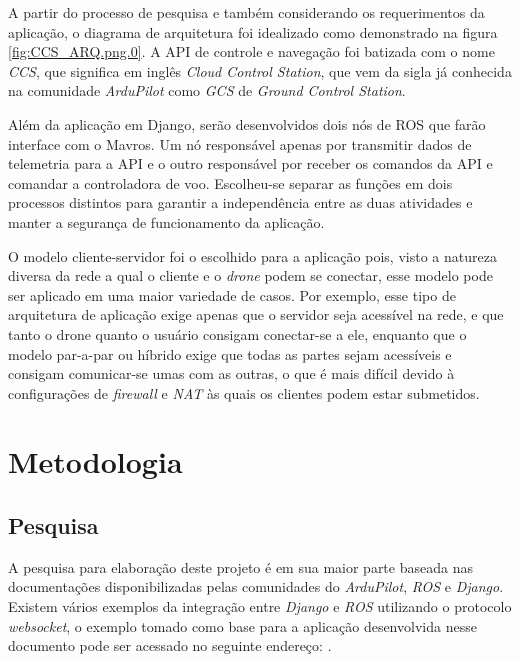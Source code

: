 \documentclass[12pt,a4paper,oneside]{book}
\begin{document}
A partir do processo de pesquisa e também considerando os requerimentos da aplicação, o diagrama de arquitetura foi idealizado como demonstrado na figura \ref{fig:CCS_ARQ.png.0}. A API de controle e navegação foi batizada com o nome \textit{CCS}, que significa em inglês \textit{Cloud Control Station}, que vem da sigla já conhecida na comunidade \textit{ArduPilot} como \textit{GCS} de \textit{Ground Control Station}.   

Além da aplicação em Django, serão desenvolvidos dois nós de ROS que farão interface com o Mavros. Um nó responsável apenas por transmitir dados de telemetria para a API e o outro responsável por receber os comandos da API e comandar a controladora de voo. Escolheu-se separar as funções em dois processos distintos para garantir a independência entre as duas atividades e manter a segurança de funcionamento da aplicação.  

O modelo cliente-servidor foi o escolhido para a aplicação pois, visto a natureza diversa da rede a qual o cliente e o \textit{drone} podem se conectar, esse modelo pode ser aplicado em uma maior variedade de casos. Por exemplo, esse tipo de arquitetura de aplicação exige apenas que o servidor seja acessível na rede, e que tanto o drone quanto o usuário consigam conectar-se a ele, enquanto que o modelo par-a-par ou híbrido exige que todas as partes sejam acessíveis e consigam comunicar-se umas com as outras, o que é mais difícil devido à configurações de \textit{firewall} e \textit{NAT} às quais os clientes podem estar submetidos.  




\chapter{Metodologia}
\label{chapter:Metodologia}
%
\thispagestyle{empty} 
%
\section{Pesquisa}
%
A pesquisa para elaboração deste projeto é em sua maior parte baseada nas documentações disponibilizadas pelas comunidades do \textit{ArduPilot}, \textit{ROS} e \textit{Django}. Existem vários exemplos da integração entre \textit{Django} e \textit{ROS} utilizando o protocolo \textit{websocket}, o exemplo tomado como base para a aplicação desenvolvida nesse documento pode ser acessado no seguinte endereço: \cite{url:django_ros}.
%
\end{document}

